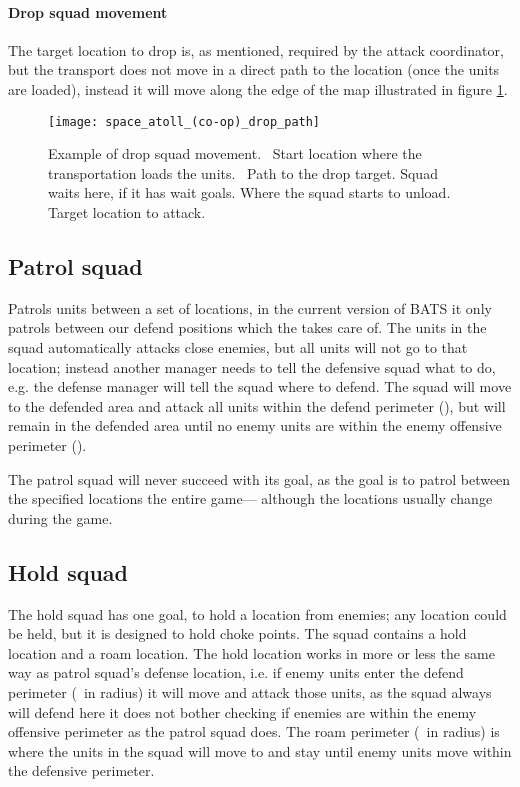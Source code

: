 
\paragraph{Drop squad movement}
The target location to drop is, as mentioned, required by the attack coordinator, but the transport does not move in a direct path to the location (once the units are loaded), instead it will move along the edge of the map illustrated in figure \ref{fig:drop_squad_movement}.
\begin{figure}[htb]
\centering
\texttt{[image: space\_atoll\_(co-op)\_drop\_path]}
\caption[Drop squad movement example]{Example of drop squad movement.
\usebox{\LegendDotGreen}~Start location where the transportation loads the units.
\usebox{\LegendLineCyan}~Path to the drop target.
\usebox{\LegendDotOrange}Squad waits here, if it has wait goals.
\usebox{\LegendDotYellow}Where the squad starts to unload.
\usebox{\LegendDotRed}Target location to attack.}
\label{fig:drop_squad_movement}
\end{figure}

\subsection{Patrol squad}
\label{sec:patrol_squad}
Patrols units between a set of locations, in the current version of BATS it only patrols between our defend positions which the  takes care of. The units in the squad automatically attacks close enemies, but all units will not go to that location; instead another manager needs to tell the defensive squad what to do, e.g. the defense manager will tell the squad where to defend. The squad will move to the defended area and attack all units within the defend perimeter (\squadDefendDefendPerimeter), but will remain in the defended area until no enemy units are within the enemy offensive perimeter (\squadDefendEnemyOffensivePerimeter).

The patrol squad will never succeed with its goal, as the goal is to patrol between the specified locations the entire game— although the locations usually change during the game.

\subsection{Hold squad}
\label{sec:hold_squad}
The hold squad has one goal, to hold a location from enemies; any location could be held, but it is designed to hold choke points. The squad contains a hold location and a roam location. The hold location works in more or less the same way as patrol squad's defense location, i.e. if enemy units enter the defend perimeter (\squadDefendDefendPerimeter~in radius) it will move and attack those units, as the squad always will defend here it does not bother checking if enemies are within the enemy offensive perimeter as the patrol squad does. The roam perimeter (\squadDefendRoamPerimeter~in radius) is where the units in the squad will move to and stay until enemy units move within the defensive perimeter.

